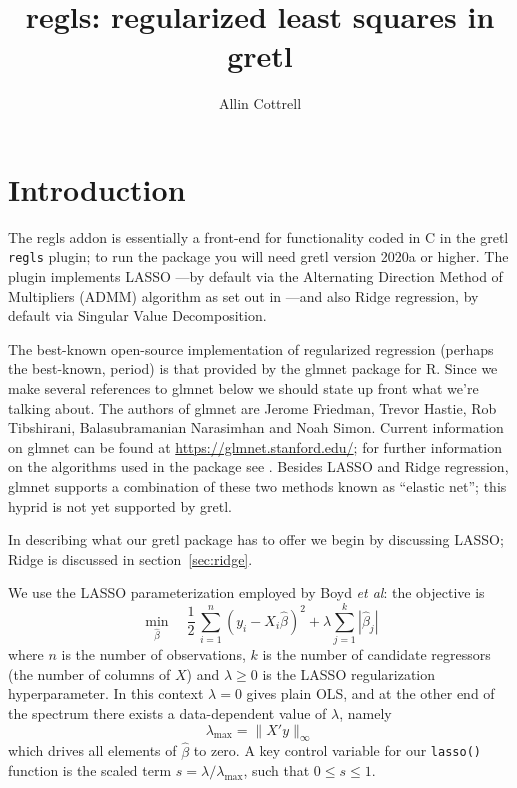 \documentclass{article}
\title{regls: regularized least squares in gretl}
\author{Allin Cottrell}
\begin{document}
\maketitle

\section{Introduction}
\label{sec:intro}

The \textsf{regls} addon is essentially a front-end for functionality
coded in C in the gretl \texttt{regls} plugin; to run the package you
will need gretl version 2020a or higher.  The plugin implements LASSO
\citep{tibshirani96}---by default via the Alternating Direction Method
of Multipliers (ADMM) algorithm as set out in \cite{boyd2010}---and
also Ridge regression, by default via Singular Value Decomposition.

The best-known open-source implementation of regularized regression
(perhaps the best-known, period) is that provided by the
\textsf{glmnet} package for \textsf{R}. Since we make several
references to \textsf{glmnet} below we should state up front what
we're talking about. The authors of \textsf{glmnet} are Jerome
Friedman, Trevor Hastie, Rob Tibshirani, Balasubramanian Narasimhan
and Noah Simon. Current information on \textsf{glmnet} can be found at
\url{https://glmnet.stanford.edu/}; for further information on the
algorithms used in the package see \cite{glmnet10}. Besides LASSO and
Ridge regression, \textsf{glmnet} supports a combination of these two
methods known as ``elastic net''; this hyprid is not yet supported by
gretl.

In describing what our gretl package has to offer we begin by
discussing LASSO; Ridge is discussed in section~\ref{sec:ridge}.

We use the LASSO parameterization employed by Boyd \textit{et al}: the
objective is
\begin{equation}
  \label{eq:obj}
  \min_{\hat{\beta}} \quad \frac{1}{2}\,
  \sum_{i=1}^n (y_i - X_i\hat{\beta})^2 + \lambda \sum_{j=1}^k |\hat{\beta}_j|
\end{equation}
where $n$ is the number of observations, $k$ is the number of
candidate regressors (the number of columns of $X$) and
$\lambda \geq 0$ is the LASSO regularization hyperparameter. In this
context $\lambda = 0$ gives plain OLS, and at the other end of the
spectrum there exists a data-dependent value of $\lambda$, namely
\begin{equation}
  \label{eq:lmax}
  \lambda_{\max} = \|X'y\|_{\infty}
\end{equation}
which drives all elements of $\hat{\beta}$ to zero.  A key control
variable for our \texttt{lasso()} function is the scaled term
$s = \lambda/\lambda_{\max}$, such that $0 \leq s \leq 1$.
\end{document}

